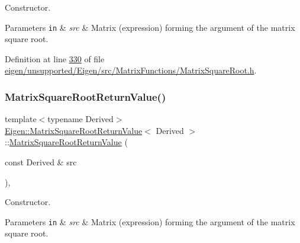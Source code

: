 Constructor. 


\begin{DoxyParams}[1]{Parameters}
\mbox{\tt in}  & {\em src} & Matrix (expression) forming the argument of the matrix square root. \\
\hline
\end{DoxyParams}


Definition at line \hyperlink{eigen_2unsupported_2_eigen_2src_2_matrix_functions_2_matrix_square_root_8h_source_l00330}{330} of file \hyperlink{eigen_2unsupported_2_eigen_2src_2_matrix_functions_2_matrix_square_root_8h_source}{eigen/unsupported/\+Eigen/src/\+Matrix\+Functions/\+Matrix\+Square\+Root.\+h}.

\mbox{\label{class_eigen_1_1_matrix_square_root_return_value_aa27fd0e59ff1711a55ee8a4342c035d5}} 
\subsubsection{\texorpdfstring{Matrix\+Square\+Root\+Return\+Value()}{MatrixSquareRootReturnValue()}\hspace{0.1cm}{\footnotesize\ttfamily [2/2]}}
{\footnotesize\ttfamily template$<$typename Derived$>$ \\
\hyperlink{class_eigen_1_1_matrix_square_root_return_value}{Eigen\+::\+Matrix\+Square\+Root\+Return\+Value}$<$ Derived $>$\+::\hyperlink{class_eigen_1_1_matrix_square_root_return_value}{Matrix\+Square\+Root\+Return\+Value} (\begin{DoxyParamCaption}\item[{const Derived \&}]{src }\end{DoxyParamCaption})\hspace{0.3cm}{\ttfamily [inline]}, {\ttfamily [explicit]}}



Constructor. 


\begin{DoxyParams}[1]{Parameters}
\mbox{\tt in}  & {\em src} & Matrix (expression) forming the argument of the matrix square root. \\
\hline
\end{DoxyParams}


